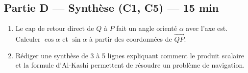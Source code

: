 
\bigskip

\subsection*{Partie D — Synthèse (C1, C5) — 15 min}

\begin{enumerate}[resume]
  \item Le cap de retour direct de $Q$ à $P$ fait un angle orienté $\alpha$ avec l'axe est. Calculer $\cos\alpha$ et $\sin\alpha$ à partir des coordonnées de $\overrightarrow{QP}$.
  \item Rédiger une synthèse de 3 à 5 lignes expliquant comment le produit scalaire et la formule d'Al-Kashi permettent de résoudre un problème de navigation.
\end{enumerate}


